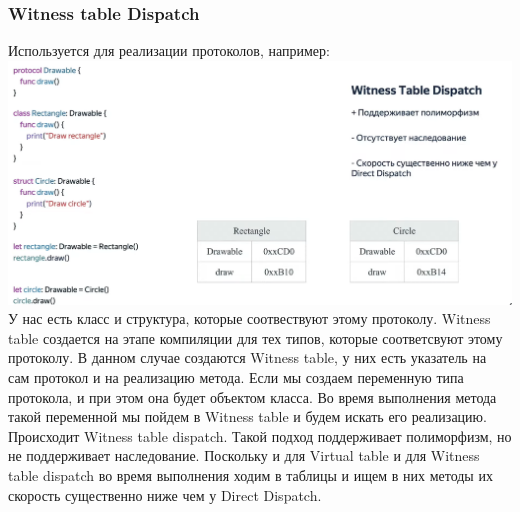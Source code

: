\documentclass{article}
\begin{document}
    \subsubsection{Witness table Dispatch}
    Используется для реализации протоколов, например:
    \newline
    \includegraphics[scale = 0.2]{pic/Снимок экрана 2023-07-28 в 19.26.31.png}
    \newline
    У нас есть класс и структура, которые соотвествуют этому протоколу. Witness table создается на этапе компиляции для тех типов, которые соответсвуют этому протоколу. В данном случае создаются Witness table, у них есть указатель на сам протокол и на реализацию метода. 
    \newline
    Если мы создаем переменную типа протокола, и при этом она будет объектом класса. Во время выполнения метода такой переменной мы пойдем в Witness table и будем искать его реализацию. Происходит Witness table dispatch. Такой подход поддерживает полиморфизм, но не поддерживает наследование. Поскольку и для Virtual table и для Witness table dispatch во время выполнения ходим в таблицы и ищем в них методы их скорость существенно ниже чем у Direct Dispatch.
\end{document}
